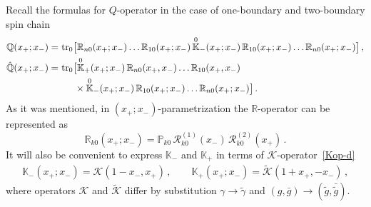\documentclass[a4paper,11pt]{article}
\newcommand{\tr}{\mathop{\rm tr}\nolimits}
\numberwithin{equation}{section}
\begin{document}
Recall the formulas for $Q$-operator in the case of one-boundary and two-boundary spin chain
\begin{align}
	\nonumber
	\mathbb{Q}(x_+;x_-) = \, & \tr_0\bigl[\mathbb{R}_{n0}(x_+;x_-)\dots\mathbb{R}_{10}(x_+;x_-)\,\overset{0}{\mathbb{K}}_-(x_+;x_-)\,\mathbb{R}_{10}(x_+;x_-)\dots\mathbb{R}_{n0}(x_+;x_-)\bigr] \,, \\
	\nonumber
	\hat{\mathbb{Q}}(x_+;x_-) = \, & \tr_0\bigl[\overset{0}{\mathbb{K}}_+(x_+;x_-)\,\mathbb{R}_{n0}(x_+,x_-)\dots\mathbb{R}_{10}(x_+,x_-) \\
	& \nonumber
	\quad\;\;\times \overset{0}{\mathbb{K}}_-(x_+;x_-)\,\mathbb{R}_{10}(x_+;x_-)\dots\mathbb{R}_{n0}(x_+;x_-)\bigr] \,.
\end{align}
As it was mentioned, in $(x_+;x_-)$-parametrization the $\mathbb{R}$-operator can be represented as
\begin{equation} \nonumber
	\mathbb{R}_{k0}(x_+;x_-) = \mathbb{P}_{k0}\,\mathcal{R}^{(1)}_{k0}(x_-)\, \mathcal{R}^{(2)}_{k0}(x_+) \,.
\end{equation}
It will also be convenient to express $\mathbb{K}_-$ and $\mathbb{K}_+$ in terms of $\mathcal{K}$-operator~\eqref{Kop-d}
\begin{align*}
	\mathbb{K}_-(x_+;x_-) = \mathcal{K}(1-x_-,x_+) \,, \qquad
	\mathbb{K}_+(x_+;x_-) = \tilde{\mathcal{K}}(1+x_+,-x_-) \,,
\end{align*}
where operators $\mathcal{K}$ and $\tilde{\mathcal{K}}$ differ by substitution $\gamma\to \tilde{\gamma}$ and $(g,\bar{g})\to (\tilde{g},\bar{\tilde{g}})$.
\end{document}

